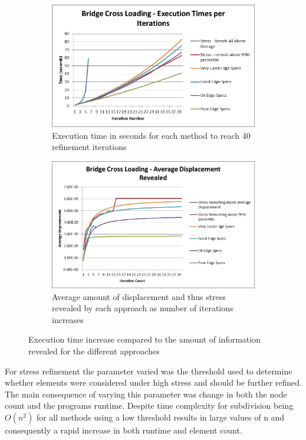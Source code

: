 \begin{figure}[!h]
\centering
\begin{subfigure}{.5\textwidth}
  \centering
  \includegraphics[width=0.9\linewidth]{../Graphics/Graphs/BridgeCrossLoadingExecutionTimesPerIterations.png}
  \caption{Execution time in seconds for each method to reach 40 refinement iterations}
  \label{fig:sub1}
\end{subfigure}%
\begin{subfigure}{.5\textwidth}
  \centering
  \includegraphics[width=0.9\linewidth]{../Graphics/Graphs/BridgeCrossLoadingAverageDisplacementRevealed.png}
  \caption{Average amount of displacement and thus stress revealed by each approach as number of iterations increases}
  \label{fig:sub2}
\end{subfigure}
\label{fig:test}
  \caption{Execution time increase compared to the amount of information revealed for the different approaches}
 \end{figure}

\noindent
For stress refinement the parameter varied was the threshold used to determine whether elements were considered under high stress and should be further refined. The main consequence of varying this parameter was change in both the node count and the programs runtime. Despite time complexity for subdivision being $O(n^2)$ for all methods using a low threshold results in large values of n and consequently a rapid increase in both runtime and element count. \\

